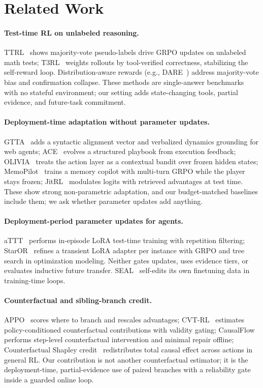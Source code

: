 \section{Related Work}
\paragraph{Test-time RL on unlabeled reasoning.}
TTRL~\cite{ttrl2025} shows majority-vote pseudo-labels drive GRPO updates
on unlabeled math tests; T3RL~\cite{t3rl2026} weights rollouts by
tool-verified correctness, stabilizing the self-reward loop.
Distribution-aware rewards (e.g., DARE~\cite{dare2026}) address
majority-vote bias and confirmation collapse. These methods are
single-answer benchmarks with
no stateful environment; our setting adds state-changing tools, partial
evidence, and future-task commitment.

\paragraph{Deployment-time adaptation without parameter updates.}
GTTA~\cite{gtta2026} adds a syntactic alignment vector and verbalized
dynamics grounding for web agents; ACE~\cite{ace2025} evolves a
structured playbook from execution feedback; OLIVIA~\cite{olivia2026}
treats the action layer as a contextual bandit over frozen hidden
states; MemoPilot~\cite{memopilot2026} trains a memory copilot with
multi-turn GRPO while the player stays frozen; JitRL~\cite{jitrl2026}
modulates logits with retrieved advantages at test time. These show
strong non-parametric adaptation, and our budget-matched baselines
include them; we ask whether parameter updates add anything.

\paragraph{Deployment-period parameter updates for agents.}
aTTT~\cite{att2026} performs in-episode LoRA test-time training with
repetition filtering; StarOR~\cite{staror2026} refines a transient LoRA
adapter per instance with GRPO and tree search in optimization modeling.
Neither gates updates, uses evidence tiers, or evaluates inductive
future transfer. SEAL~\cite{seal2025} self-edits its own finetuning data
in training-time loops.

\paragraph{Counterfactual and sibling-branch credit.}
APPO~\cite{appo2026} scores where to branch
and rescales advantages; CVT-RL~\cite{cvtrl2026} estimates
policy-conditioned counterfactual contributions with validity gating;
CausalFlow~\cite{causalflow2026} performs step-level counterfactual
intervention and minimal repair offline; Counterfactual Shapley
credit~\cite{shapley2026} redistributes total causal effect across
actions in general RL. Our contribution is not another counterfactual
estimator; it is the deployment-time, partial-evidence use of paired
branches with a reliability gate inside a guarded online loop.

